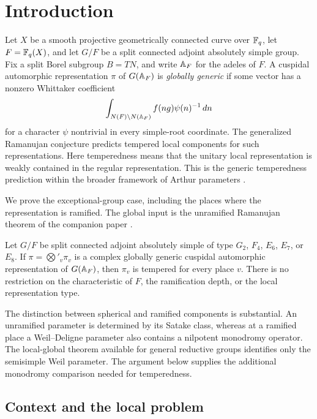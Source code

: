 \section{Introduction}

Let $X$ be a smooth projective geometrically connected curve over
$\mathbb F_q$, let $F=\mathbb F_q(X)$, and let $G/F$ be a split connected adjoint
absolutely simple group. Fix a split Borel subgroup $B=TN$, and write
$\mathbb A_F$ for the adeles of $F$. A cuspidal automorphic representation
$\pi$ of $G(\mathbb A_F)$ is \emph{globally generic} if some vector has a
nonzero Whittaker coefficient
\[
 \int_{N(F)\backslash N(\mathbb A_F)} f(ng)\psi(n)^{-1}\,dn
\]
for a character $\psi$ nontrivial in every simple-root coordinate.
The generalized Ramanujan conjecture predicts tempered local
components for such representations. Here temperedness means that
the unitary local representation is weakly contained in the regular
representation. This is the generic temperedness prediction within the
broader framework of Arthur parameters \cite{Arthur1989,Shahidi2011}.

We prove the exceptional-group case, including the places where the
representation is ramified. The global input is the unramified
Ramanujan theorem of the companion paper \cite[Corollary~1.2]{UnramifiedRamanujan}.

\begin{theorem}\label{thm:main}
Let $G/F$ be split connected adjoint absolutely simple of type
$G_2$, $F_4$, $E_6$, $E_7$, or $E_8$. If
$\pi=\bigotimes'_v\pi_v$ is a complex globally generic cuspidal
automorphic representation of $G(\mathbb A_F)$, then $\pi_v$ is tempered
for every place $v$. There is no restriction on the characteristic
of $F$, the ramification depth, or the local representation type.
\end{theorem}

The distinction between spherical and ramified components is
substantial. An unramified parameter is determined by its Satake
class, whereas at a ramified place a Weil--Deligne parameter also
contains a nilpotent monodromy operator. The local-global theorem
available for general reductive groups identifies only the
semisimple Weil parameter. The argument below supplies the
additional monodromy comparison needed for temperedness.

\subsection{Context and the local problem}


